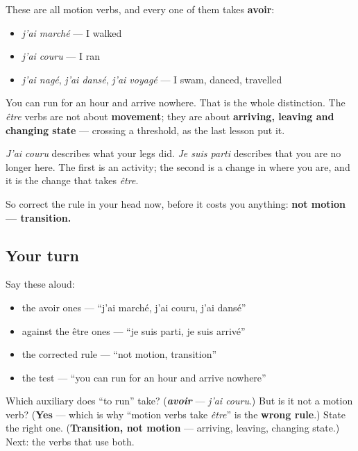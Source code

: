 \begin{grammarlens}[title={Grammar Lens: moving is not arriving}]
These are all motion verbs, and every one of them takes \textbf{avoir}:

\begin{itemize}
\raggedright
  \item \emph{j'ai marché} — I walked
  \item \emph{j'ai couru} — I ran
  \item \emph{j'ai nagé}, \emph{j'ai dansé}, \emph{j'ai voyagé} — I swam, danced, travelled
\end{itemize}

You can run for an hour and arrive nowhere. That is the whole distinction. The \emph{être} verbs are not about \textbf{movement}; they are about \textbf{arriving, leaving and changing state} — crossing a threshold, as the last lesson put it.

\emph{J'ai couru} describes what your legs did. \emph{Je suis parti} describes that you are no longer here. The first is an activity; the second is a change in where you are, and it is the change that takes \emph{être}.

So correct the rule in your head now, before it costs you anything: \textbf{not motion — transition.}
\end{grammarlens}

\subsection*{Your turn}
Say these aloud:

\begin{itemize}
\raggedright
  \item the avoir ones — \textquotedblleft{}j'ai marché, j'ai couru, j'ai dansé\textquotedblright{}
  \item against the être ones — \textquotedblleft{}je suis parti, je suis arrivé\textquotedblright{}
  \item the corrected rule — \textquotedblleft{}not motion, transition\textquotedblright{}
  \item the test — \textquotedblleft{}you can run for an hour and arrive nowhere\textquotedblright{}
\end{itemize}

\begin{tcolorbox}[breakable,colback=teal!4,colframe=teal!35!black,title={Before you move on}]
Which auxiliary does \textquotedblleft{}to run\textquotedblright{} take? (\emph{\textbf{avoir}} — \emph{j'ai couru}.) But is it not a motion verb? (\textbf{Yes} — which is why \textquotedblleft{}motion verbs take \emph{être}\textquotedblright{} is the \textbf{wrong rule}.) State the right one. (\textbf{Transition, not motion} — arriving, leaving, changing state.) Next: the verbs that use both.
\end{tcolorbox}
